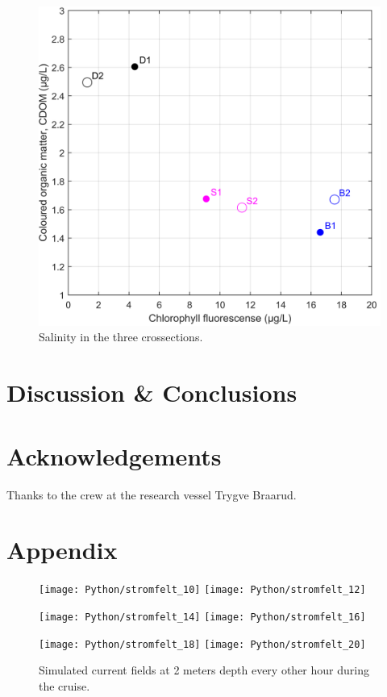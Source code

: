 \documentclass[12pt,a4paper,english]{article}
\begin{document}
\begin{figure}[ht]
\centerline{
\includegraphics*[width=\textwidth]{Figurer/CF_diagram.png}}
\caption{\small
Salinity in the three crossections.}
\label{fig:CFdiagram}
\end{figure}



\section{Discussion \& Conclusions}



\clearpage
\section*{\hspace{17mm}Acknowledgements}
Thanks to the crew at the research vessel Trygve Braarud.

\clearpage
\section*{\hspace{17mm}Appendix}

\begin{figure}[h]
\centerline{
\texttt{[image: Python/stromfelt\_10]}
\texttt{[image: Python/stromfelt\_12]}
}
\centerline{
\texttt{[image: Python/stromfelt\_14]}
\texttt{[image: Python/stromfelt\_16]}
}
\centerline{
\texttt{[image: Python/stromfelt\_18]}
\texttt{[image: Python/stromfelt\_20]}
}
\caption{\small
Simulated current fields at 2 meters depth every other hour during the cruise.}
\label{fig:Current1}
\end{figure}
\end{document}
